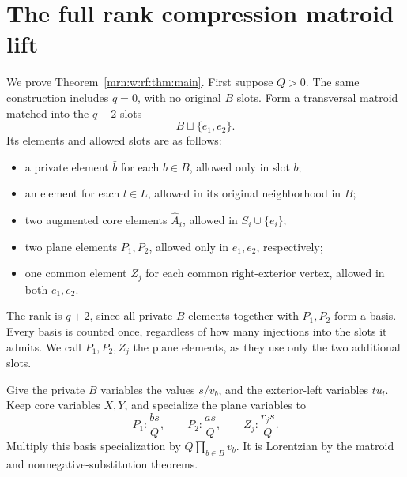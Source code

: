 \documentclass[11pt,a4paper]{article}
\theoremstyle{remark}\newtheorem{remark}[theorem]{Remark}
\begin{document}
\section{The full rank compression matroid lift}\label{mrn:w:rf:sec:fulllift}
We prove Theorem~\ref{mrn:w:rf:thm:main}. First suppose $Q>0$. The same construction includes $q=0$, with no original $B$ slots. Form a transversal matroid matched into the $q+2$ slots
\[
 B\sqcup\{e_1,e_2\}.
\]
Its elements and allowed slots are as follows:
\begin{itemize}
\item a private element $\bar b$ for each $b\in B$, allowed only in slot $b$;
\item an element for each $l\in L$, allowed in its original neighborhood in $B$;
\item two augmented core elements $\widehat A_i$, allowed in $S_i\cup\{e_i\}$;
\item two plane elements $P_1,P_2$, allowed only in $e_1,e_2$, respectively;
\item one common element $Z_j$ for each common right-exterior vertex, allowed in both $e_1,e_2$.
\end{itemize}
The rank is $q+2$, since all private $B$ elements together with $P_1,P_2$ form a basis. Every basis is counted once, regardless of how many injections into the slots it admits. We call $P_1,P_2,Z_j$ the plane elements, as they use only the two additional slots.

Give the private $B$ variables the values $s/v_b$, and the exterior-left variables $tu_l$. Keep core variables $X,Y$, and specialize the plane variables to
\begin{equation}\label{mrn:w:rf:eq:planeweights}
 P_1:\frac{bs}{Q},\qquad P_2:\frac{as}{Q},\qquad
 Z_j:\frac{r_js}{Q}.
\end{equation}
Multiply this basis specialization by $Q\prod_{b\in B}v_b$. It is Lorentzian by the matroid and nonnegative-substitution theorems.
\end{document}
